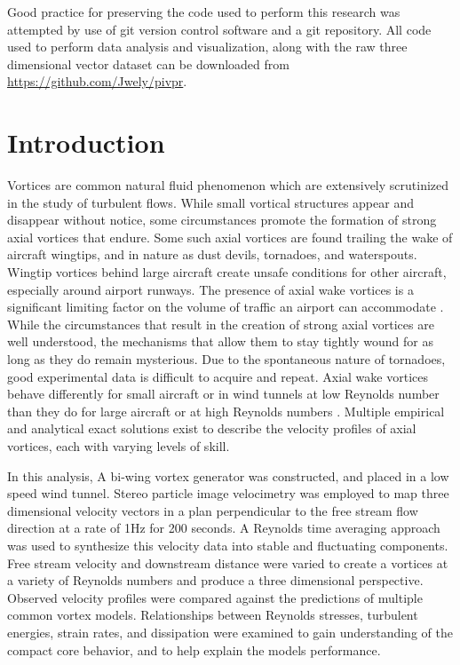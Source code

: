 \documentclass[12pt]{report}
\begin{document}
Good practice for preserving the code used to perform this research was 
attempted by use of git version control software and a git repository. All code 
used to perform data analysis and visualization, along with the raw three 
dimensional vector dataset can be downloaded from 
\url{https://github.com/Jwely/pivpr}.
	
%

\afterpreface

\chapter{Introduction}
Vortices are common natural fluid phenomenon which are extensively scrutinized 
in the study of turbulent flows. While small vortical structures appear and 
disappear without notice, some circumstances promote the formation of strong 
axial vortices that endure. Some such axial vortices are found trailing the 
wake of aircraft wingtips, and in nature as dust devils, tornadoes, and 
waterspouts. Wingtip vortices behind large aircraft create unsafe conditions 
for other aircraft, especially around airport runways. The presence of axial 
wake vortices is a significant limiting factor on the volume of traffic an 
airport can accommodate \cite{hallock1991}. While the circumstances that result 
in the creation of strong axial vortices are well understood, the mechanisms 
that allow them to stay tightly wound for as long as they do remain mysterious. 
Due to the spontaneous nature of tornadoes, good experimental data is difficult 
to acquire and repeat. Axial wake vortices behave differently for 
small aircraft or in wind tunnels at low Reynolds number than they do for large 
aircraft or at high Reynolds numbers \cite{burnam2013}. Multiple empirical and 
analytical exact solutions exist to describe the velocity profiles of axial 
vortices, each with varying levels of skill.

In this analysis, A bi-wing vortex generator was constructed, and placed in 
a low speed wind tunnel. Stereo particle image velocimetry was employed to 
map three dimensional velocity vectors in a plan perpendicular to the free 
stream flow direction at a rate of 1Hz for 200 seconds. A Reynolds time 
averaging approach was used to synthesize this velocity data into stable 
and fluctuating components. Free stream velocity and downstream distance 
were varied to create a vortices at a variety of Reynolds numbers and produce a 
three dimensional perspective. Observed velocity profiles were compared against 
the predictions of multiple common vortex models. Relationships between 
Reynolds stresses, turbulent energies, strain rates, and dissipation were
examined to gain understanding of the compact core behavior, and to help 
explain the models performance.
\end{document}
